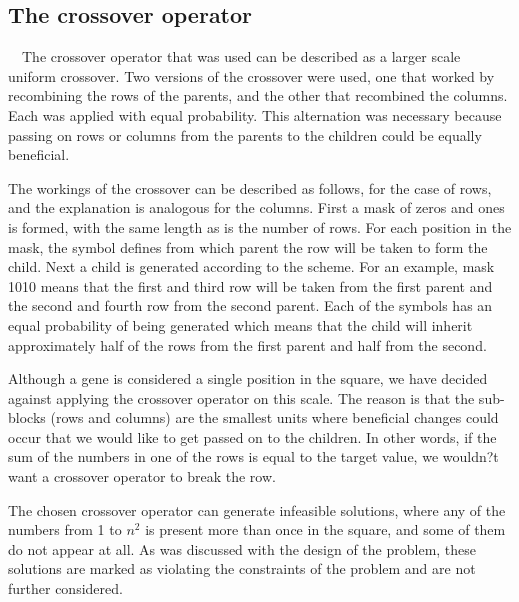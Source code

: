 \subsection[The crossover operator]{\label{identificadorReferenciaCruzada}
The crossover operator}

\ \ The crossover operator that was used can be described as a larger scale uniform crossover. Two versions of the crossover were used, one that worked by recombining the rows of the parents, and the other that recombined the columns. Each was applied with equal probability. This alternation was necessary because passing on rows or columns from the parents to the children could be equally beneficial.

The workings of the crossover can be described as follows, for the case of rows, and the explanation is analogous for the columns. First a mask of zeros and ones is formed, with the same length as is the number of rows. For each position in the mask, the symbol defines from which parent the row will be taken to form the child. Next a child is generated according to the scheme. For an example, mask 1010 means that the first and third row will be taken from the first parent and the second and fourth row from the second parent. Each of the symbols has an equal probability of being generated which means that the child will inherit approximately half of the rows from the first parent and half from the second.

Although a gene is considered a single position in the square, we have decided against applying the crossover operator on this scale. The reason is that the sub-blocks (rows and columns) are the smallest units where beneficial changes could occur that we would like to get passed on to the children. In other words, if the sum of the numbers in one of the rows is equal to the target value, we wouldn?t want a crossover operator to break the row.

The chosen crossover operator can generate infeasible solutions, where any of the numbers from 1 to $n^2$ is present more than once in the square, and some of them do not appear at all. As was discussed with the design of the problem, these solutions are marked as violating the constraints of the problem and are not further considered.
